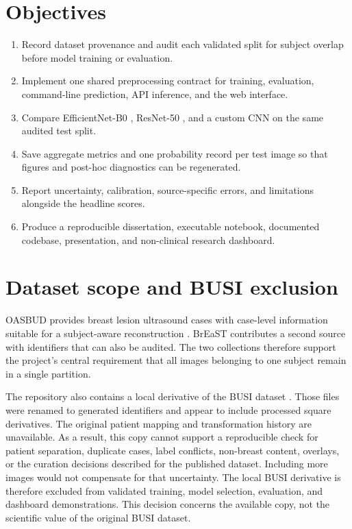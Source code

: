 \documentclass[10pt]{article}
\begin{document}
\section{Objectives}

\begin{enumerate}
  \item Record dataset provenance and audit each validated split for subject overlap before model training or evaluation.
  \item Implement one shared preprocessing contract for training, evaluation, command-line prediction, API inference, and the web interface.
  \item Compare EfficientNet-B0 \citep{Tan2019}, ResNet-50 \citep{He2016}, and a custom CNN on the same audited test split.
  \item Save aggregate metrics and one probability record per test image so that figures and post-hoc diagnostics can be regenerated.
  \item Report uncertainty, calibration, source-specific errors, and limitations alongside the headline scores.
  \item Produce a reproducible dissertation, executable notebook, documented codebase, presentation, and non-clinical research dashboard.
\end{enumerate}

\section{Dataset scope and BUSI exclusion}

OASBUD provides breast lesion ultrasound cases with case-level information suitable for a subject-aware reconstruction \citep{Piotrzkowska2017}. BrEaST contributes a second source with identifiers that can also be audited. The two collections therefore support the project's central requirement that all images belonging to one subject remain in a single partition.

The repository also contains a local derivative of the BUSI dataset \citep{AlDhabyani2020}. Those files were renamed to generated identifiers and appear to include processed square derivatives. The original patient mapping and transformation history are unavailable. As a result, this copy cannot support a reproducible check for patient separation, duplicate cases, label conflicts, non-breast content, overlays, or the curation decisions described for the published dataset. Including more images would not compensate for that uncertainty. The local BUSI derivative is therefore excluded from validated training, model selection, evaluation, and dashboard demonstrations. This decision concerns the available copy, not the scientific value of the original BUSI dataset.
\end{document}
